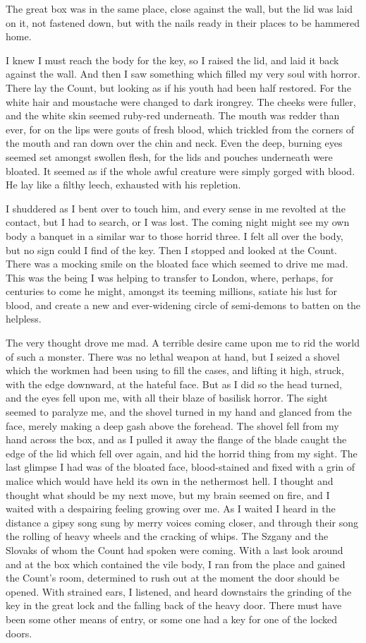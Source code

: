 The great box was in the same place, close against the wall, but the lid was laid on it, not fastened down, but with the nails ready in their places to be hammered home. 

I knew I must reach the body for the key, so I raised the lid, and laid it back against the wall. And then I saw something which filled my very soul with horror. There lay the Count, but looking as if his youth had been half restored. For the white hair and moustache were changed to dark irongrey. The cheeks were fuller, and the white skin seemed ruby-red underneath. The mouth was redder than ever, for on the lips were gouts of fresh blood, which trickled from the corners of the mouth and ran down over the chin and neck. Even the deep, burning eyes seemed set amongst swollen flesh, for the lids and pouches underneath were bloated. It seemed as if the whole awful creature were simply gorged with blood. He lay like a filthy leech, exhausted with his repletion. 

I shuddered as I bent over to touch him, and every sense in me revolted at the contact, but I had to search, or I was lost. The coming night might see my own body a banquet in a similar war to those horrid three. I felt all over the body, but no sign could I find of the key. Then I stopped and looked at the Count. There was a mocking smile on the bloated face which seemed to drive me mad. This was the being I was helping to transfer to London, where, perhaps, for centuries to come he might, amongst its teeming millions, satiate his lust for blood, and create a new and ever-widening circle of semi-demons to batten on the helpless. 

The very thought drove me mad. A terrible desire came upon me to rid the world of such a monster. There was no lethal weapon at hand, but I seized a shovel which the workmen had been using to fill the cases, and lifting it high, struck, with the edge downward, at the hateful face. But as I did so the head turned, and the eyes fell upon me, with all their blaze of basilisk horror. The sight seemed to paralyze me, and the shovel turned in my hand and glanced from the face, merely making a deep gash above the forehead. The shovel fell from my hand across the box, and as I pulled it away the flange of the blade caught the edge of the lid which fell over again, and hid the horrid thing from my sight. The last glimpse I had was of the bloated face, blood-stained and fixed with a grin of malice which would have held its own in the nethermost hell. I thought and thought what should be my next move, but my brain seemed on fire, and I waited with a despairing feeling growing over me. As I waited I heard in the distance a gipsy song sung by merry voices coming closer, and through their song the rolling of heavy wheels and the cracking of whips. The Szgany and the Slovaks of whom the Count had spoken were coming. With a last look around and at the box which contained the vile body, I ran from the place and gained the Count's room, determined to rush out at the moment the door should be opened. With strained ears, I listened, and heard downstairs the grinding of the key in the great lock and the falling back of the heavy door. There must have been some other means of entry, or some one had a key for one of the locked doors. 

